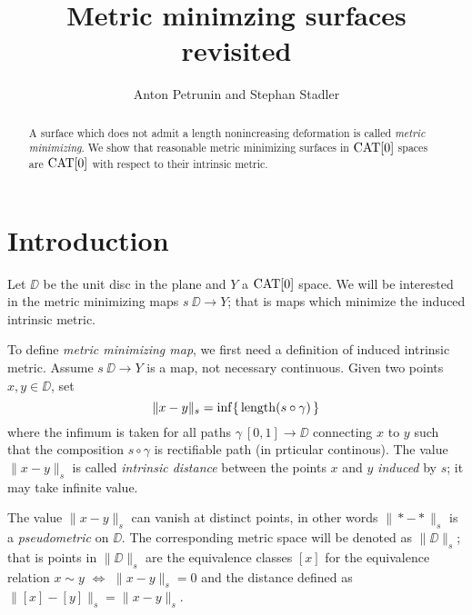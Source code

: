 \documentclass{article}
\begin{document}
\title{Metric minimzing surfaces revisited}
\author{Anton Petrunin and Stephan Stadler}


\date{}

\maketitle

\begin{abstract}
A surface which does not admit a length nonincreasing deformation is called \emph{metric minimizing}.
We show that reasonable metric minimizing surfaces in $\mathop{\rm CAT}\nolimits[0]$ spaces are $\mathop{\rm CAT}\nolimits[0]$ with respect to their intrinsic metric. 

\end{abstract}

\section{Introduction}

Let $\DD$ be the unit disc in the plane and $Y$ a $\mathop{\rm CAT}\nolimits[0]$ space.
We will be interested in the metric minimizing maps $s\:\DD\to Y$;
that is maps which minimize the induced intrinsic metric.

To define \emph{metric minimizing map}, we first need a definition of induced intrinsic metric.
Assume $s\:\DD\to Y$ is a map, not necessary continuous.
Given two points $x,y\in \DD$, set 
\[\|x-y\|_s=\inf\{\,\mathop{\rm length}\nolimits (s\circ\gamma)\,\}\] 
where the infimum is taken for all paths $\gamma\:[0,1]\to\DD$ 
connecting $x$ to $y$ such that the composition $s\circ\gamma$ is rectifiable path (in prticular continous).
The value $\|x-y\|_s$ is called \emph{intrinsic distance} between the points $x$ and $y$ \emph{induced} by $s$; 
it may take infinite value.

The value $\|x-y\|_s$ can vanish at distinct points, in other words $\|{*}-{*}\|_s$ is a \emph{pseudometric} on $\DD$.
The corresponding metric space will be denoted as $\|\DD\|_s$;
that is points in $\|\DD\|_s$ are the equivalence classes $[x]$ for the equivalence relation $x\sim y$ $\iff$ $\|x-y\|_s=0$
and the distance defined as $\|[x]-[y]\|_s=\|x-y\|_s$.
\end{document}
